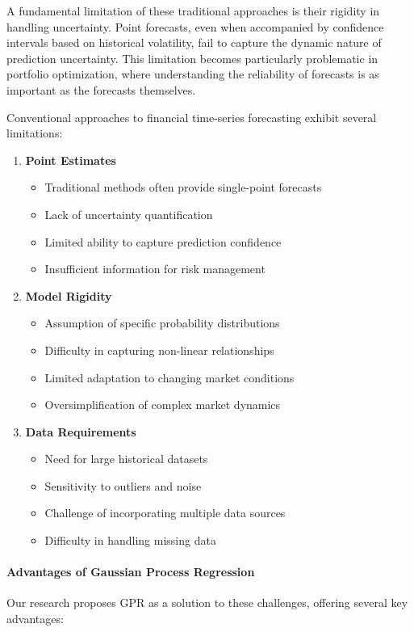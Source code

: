 A fundamental limitation of these traditional approaches is their rigidity in handling uncertainty. Point forecasts, even when accompanied by confidence intervals based on historical volatility, fail to capture the dynamic nature of prediction uncertainty. This limitation becomes particularly problematic in portfolio optimization, where understanding the reliability of forecasts is as important as the forecasts themselves.

Conventional approaches to financial time-series forecasting exhibit several limitations:

\begin{enumerate}
    \item \textbf{Point Estimates}
    \begin{itemize}
        \item Traditional methods often provide single-point forecasts
        \item Lack of uncertainty quantification
        \item Limited ability to capture prediction confidence
        \item Insufficient information for risk management
    \end{itemize}

    \item \textbf{Model Rigidity}
    \begin{itemize}
        \item Assumption of specific probability distributions
        \item Difficulty in capturing non-linear relationships
        \item Limited adaptation to changing market conditions
        \item Oversimplification of complex market dynamics
    \end{itemize}

    \item \textbf{Data Requirements}
    \begin{itemize}
        \item Need for large historical datasets
        \item Sensitivity to outliers and noise
        \item Challenge of incorporating multiple data sources
        \item Difficulty in handling missing data
    \end{itemize}
\end{enumerate}

\paragraph{Advantages of Gaussian Process Regression}
Our research proposes \ac{GPR} as a solution to these challenges, offering several key advantages:

